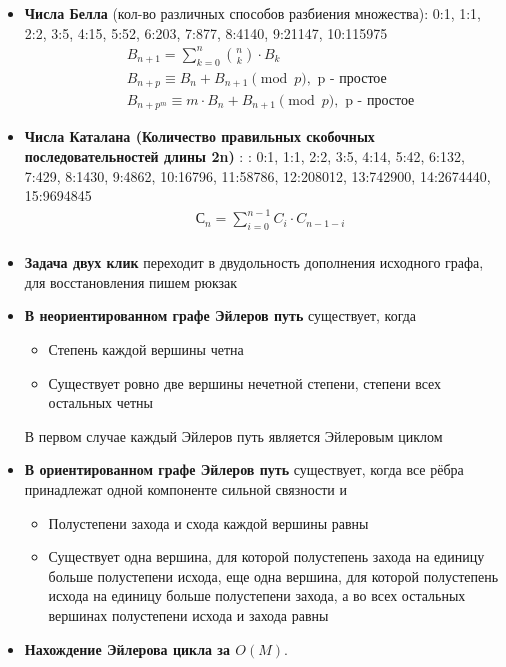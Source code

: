 \documentclass[10pt]{article}
\begin{document}
\begin{itemize}
\begin{longtable}[c]{llllllll}
\end{longtable}
\item \textbf{Числа Белла} (кол-во различных способов разбиения множества): 0:1, 1:1, 2:2, 3:5, 4:15, 5:52, 6:203, 7:877, 8:4140, 9:21147, 10:115975\\
\begin{equation}
  \begin{split}
    &B_{n + 1} = \sum\limits_{k = 0}^n\binom{n}{k} \cdot B_k\\
    &B_{n + p} \equiv B_n + B_{n + 1}\pmod{p}, \text{ p - простое}\\
    &B_{n + p^m} \equiv m \cdot B_n + B_{n + 1}\pmod{p}, \text{ p - простое}
  \end{split}
\end{equation}

\item \textbf{Числа Каталана (Количество правильных скобочных последовательностей длины 2n) }: : 0:1, 1:1, 2:2, 3:5, 4:14, 5:42, 6:132, 7:429, 8:1430, 9:4862, 10:16796, 11:58786, 12:208012, 13:742900,
14:2674440, 15:9694845
\begin{equation}
  \begin{split}
    &С_{n} = \sum\limits_{i = 0}^{n - 1}C_i \cdot C_{n - 1 - i}\\
  \end{split}
\end{equation}
\item \textbf{Задача двух клик} переходит в двудольность дополнения исходного графа, для восстановления пишем рюкзак
\item \textbf{В неориентированном графе Эйлеров путь} существует, когда 
\begin{itemize}
  \item Степень каждой вершины четна
  \item Существует ровно две вершины нечетной степени, степени всех остальных четны
\end{itemize}
В первом случае каждый Эйлеров путь является Эйлеровым циклом
\item \textbf{В ориентированном графе Эйлеров путь} существует, когда все рёбра принадлежат одной компоненте сильной связности и
\begin{itemize}
  \item Полустепени захода и схода каждой вершины равны
  \item Существует одна вершина, для которой полустепень захода на единицу
  больше полустепени исхода, еще одна вершина, для которой полустепень исхода на единицу больше полустепени захода,
  а во всех остальных вершинах полустепени исхода и захода равны
\end{itemize}
\item \textbf{Нахождение Эйлерова цикла за $O(M)$}.


\end{itemize}
\end{document}
